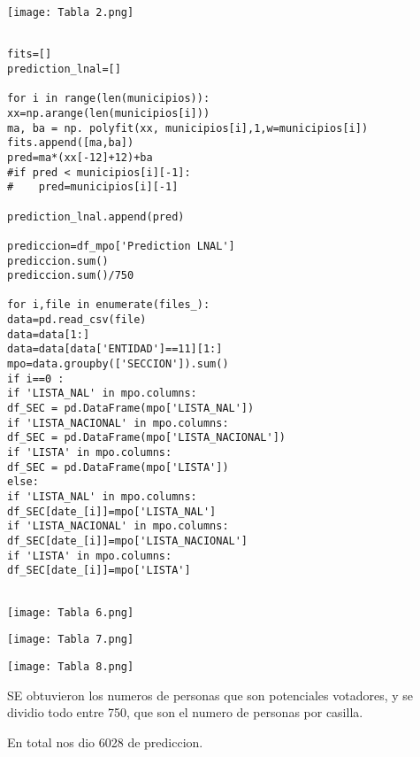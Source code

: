 \documentclass[
	12pt, %
]{fphw}
\begin{document}
\begin{center}
	\texttt{[image: Tabla 2.png]} %
\end{center}

\lstset{language=Python}
\lstset{frame=lines}
\lstset{basicstyle=\footnotesize}
\begin{lstlisting}

fits=[]
prediction_lnal=[]

for i in range(len(municipios)):
xx=np.arange(len(municipios[i]))
ma, ba = np. polyfit(xx, municipios[i],1,w=municipios[i])
fits.append([ma,ba])
pred=ma*(xx[-12]+12)+ba
#if pred < municipios[i][-1]:
#    pred=municipios[i][-1]

prediction_lnal.append(pred)

prediccion=df_mpo['Prediction LNAL']
prediccion.sum()
prediccion.sum()/750

for i,file in enumerate(files_):
data=pd.read_csv(file)
data=data[1:]
data=data[data['ENTIDAD']==11][1:]
mpo=data.groupby(['SECCION']).sum()
if i==0 :
if 'LISTA_NAL' in mpo.columns:
df_SEC = pd.DataFrame(mpo['LISTA_NAL'])
if 'LISTA_NACIONAL' in mpo.columns:
df_SEC = pd.DataFrame(mpo['LISTA_NACIONAL'])
if 'LISTA' in mpo.columns:
df_SEC = pd.DataFrame(mpo['LISTA'])
else:
if 'LISTA_NAL' in mpo.columns:
df_SEC[date_[i]]=mpo['LISTA_NAL']
if 'LISTA_NACIONAL' in mpo.columns:
df_SEC[date_[i]]=mpo['LISTA_NACIONAL']
if 'LISTA' in mpo.columns:
df_SEC[date_[i]]=mpo['LISTA']


\end{lstlisting}


\begin{center}
	\texttt{[image: Tabla 6.png]} %
\end{center}
\begin{center}
	\texttt{[image: Tabla 7.png]} %
\end{center}
\begin{center}
	\texttt{[image: Tabla 8.png]} %
\end{center}

SE obtuvieron los numeros de personas que son potenciales votadores, y se dividio todo entre 750, que son el numero de personas por casilla.

En total nos dio 6028 de prediccion.
\end{document}
